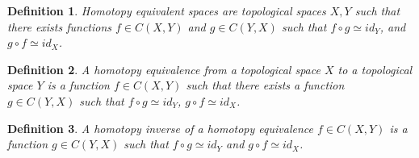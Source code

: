 \documentclass{article}
\theoremstyle{mystyle}
\newtheorem{definition}{Definition}[section]
\begin{document}
\begin{definition}
Homotopy equivalent spaces are topological spaces $X,Y$ such that there exists functions $f\in C(X,Y)$ and $g\in C(Y,X)$ such that $f\circ g \simeq id_{Y}$, and $g\circ f \simeq id_{X}$.
\end{definition}
\begin{definition}
A homotopy equivalence from a topological space $X$ to a topological space $Y$ is a function $f\in C(X,Y)$ such that there exists a function $g\in C(Y,X)$ such that $f\circ g \simeq id_{Y}$, $g\circ f \simeq id_{X}$.
\end{definition}
\begin{definition}
A homotopy inverse of a homotopy equivalence $f\in C(X,Y)$ is a function $g\in C(Y,X)$ such that $f\circ g \simeq id_{Y}$ and $g\circ f \simeq id_{X}$.
\end{definition}
\end{document}
